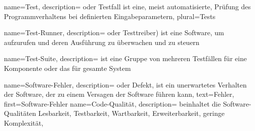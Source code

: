  {
  name={Test},
  description= {oder Testfall ist eine, meist automatisierte, Prüfung des Programmverhaltens bei definierten Eingabeparametern},
  plural=Tests
}

 {
  name={Test-Runner},
  description= {oder Testtreiber) ist eine Software, um  aufzurufen und deren Ausführung zu überwachen und zu steuern}
}

 {
  name={Test-Suite},
  description= {ist eine Gruppe von mehreren Testfällen für eine Komponente oder das für gesamte System}
}

 {
  name={Software-Fehler},
  description= {oder Defekt, ist ein unerwartetes Verhalten der Software, der zu einem Versagen der Software führen kann},
text=Fehler,
first={Software-Fehler}
}
 {
  name={Code-Qualität},
  description= {beinhaltet die Software-Qualitäten Lesbarkeit, Testbarkeit, Wartbarkeit, Erweiterbarkeit, geringe Komplexität},
}

